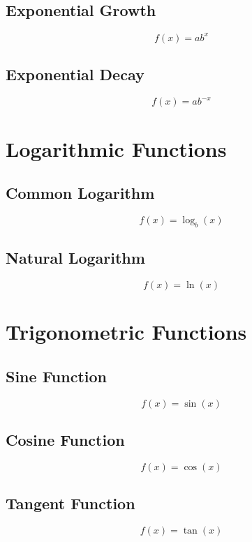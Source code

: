 \documentclass{book}
\begin{document}
\subsection{Exponential Growth}
\begin{equation}
    f(x) = ab^x
\end{equation}

\subsection{Exponential Decay}
\begin{equation}
    f(x) = ab^{-x}
\end{equation}

\section{Logarithmic Functions}
\subsection{Common Logarithm}
\begin{equation}
    f(x) = \log_b(x)
\end{equation}

\subsection{Natural Logarithm}
\begin{equation}
    f(x) = \ln(x)
\end{equation}

\section{Trigonometric Functions}
\subsection{Sine Function}
\begin{equation}
    f(x) = \sin(x)
\end{equation}

\subsection{Cosine Function}
\begin{equation}
    f(x) = \cos(x)
\end{equation}

\subsection{Tangent Function}
\begin{equation}
    f(x) = \tan(x)
\end{equation}
\end{document}
